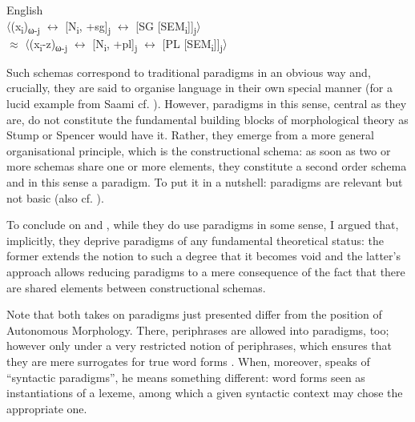 \documentclass[output=paper]{langsci/langscibook}
\begin{document}
\ea
\label{ex:reiner:22} 
{English \citep[440, number (39) there]{Booij2016}}\\

  \hphantom{${\approx}$} 〈(x\textsubscript{i})\textsubscript{ω{}-j} $\leftrightarrow $ [N\textsubscript{i}, +sg]\textsubscript{j} $\leftrightarrow $ [SG [SEM\textsubscript{i}]]\textsubscript{j}〉 \\
  ${\approx}$ 〈(x\textsubscript{i}{}-z)\textsubscript{ω{}-j} $\leftrightarrow $ [N\textsubscript{i}, +pl]\textsubscript{j} $\leftrightarrow $ [PL [SEM\textsubscript{i}]]\textsubscript{j}〉
\z

Such schemas correspond to traditional paradigms in an obvious way and, crucially, they are said to organise language in their own special manner (for a lucid example from Saami cf. \citealt[442]{Booij2016}). However, paradigms in this sense, central as they are, do not constitute the fundamental building blocks of morphological theory as Stump or Spencer would have it. Rather, they emerge from a more general organisational principle, which is the constructional schema: as soon as two or more schemas share one or more elements, they constitute a second order schema and in this sense a paradigm. To put it in a nutshell: paradigms are relevant but not basic (also cf. \citealt[239–240, 257]{MarziEtAL2020}).

To conclude on \citet{Haspelmath2000} and \citet{Booij2016}, while they do use paradigms in some sense, I argued that, implicitly, they deprive paradigms of any fundamental theoretical status: the former extends the notion to such a degree that it becomes void and the latter’s approach allows reducing paradigms to a mere consequence of the fact that there are shared elements between constructional schemas.

\begin{sloppypar}
Note that both takes on paradigms just presented differ from the position of Autonomous Morphology. There, periphrases are allowed into paradigms, too; however only under a very restricted notion of periphrases, which ensures that they are mere surrogates for true word forms \citep{BrownBrown2012}. When, moreover, \citet[147--148]{Stump2002} speaks of “syntactic paradigms”, he means something different: word forms seen as instantiations of a lexeme, among which a given syntactic context may chose the appropriate one.
\end{sloppypar}
\end{document}
